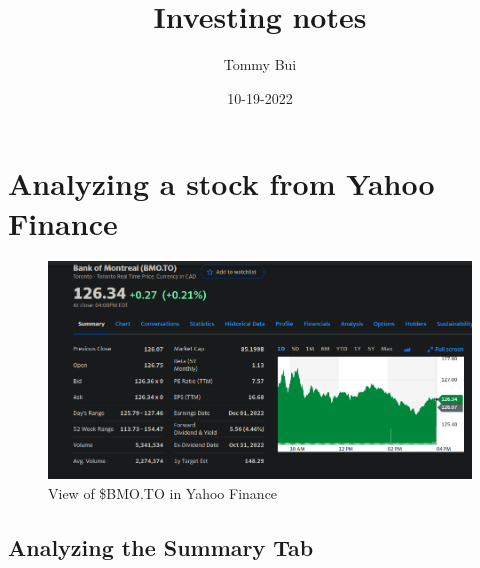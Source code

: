 \documentclass{article}
\title{Investing notes}
\date{10-19-2022}
\author{Tommy Bui}
\begin{document}
	\maketitle
	\newpage

	\tableofcontents
	\newpage

	\section{Analyzing a stock from Yahoo Finance} 
	
	\begin{figure}[h!]
		\includegraphics[width=\linewidth]{InvestingPics/figure1.png}
		\caption{View of \$BMO.TO in Yahoo Finance}
		\label{fig:chart1}
	\end{figure}


	\subsection{Analyzing the Summary Tab}
\end{document}

